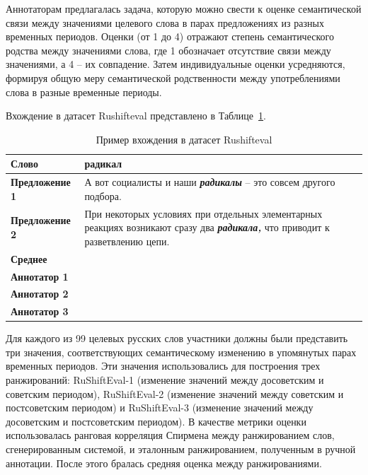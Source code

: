 \documentclass[LI,VKR]{HSEUniversity}
\begin{document}
Аннотаторам предлагалась задача, которую можно свести к оценке семантической связи между значениями
целевого слова в парах предложениях из разных временных периодов.
Оценки (от 1 до 4) отражают степень семантического родства между значениями слова, где
1 обозначает отсутствие связи между значениями, а 4 – их совпадение.
Затем индивидуальные оценки усредняются, формируя общую меру семантической родственности между
употреблениями слова в разные временные периоды.

Вхождение в датасет Rushifteval представлено в Таблице~\ref{tab:Пример вхождения в датасет Rushifteval}.

\begin{table}[H]
\centering
\caption{Пример вхождения в датасет Rushifteval}
\label{tab:Пример вхождения в датасет Rushifteval}
\begin{tabular}{|>{\raggedright\arraybackslash}p{4cm}|>{\raggedright\arraybackslash}p{10cm}|}
\hline
\textbf{Слово} & радикал \\
\hline
\textbf{Предложение 1} & А вот социалисты и наши \textbf{\textit{радикалы}} -- это совсем другого подбора. \\
\hline
\textbf{Предложение 2} & При некоторых условиях при отдельных элементарных реакциях возникают сразу два \textbf{\textit{радикала,}} что приводит к разветвлению цепи. \\
\hline
\textbf{Среднее} & 1.0 \\
\hline
\textbf{Аннотатор 1} & 1 \\
\hline
\textbf{Аннотатор 2} & 1 \\
\hline
\textbf{Аннотатор 3} & 1 \\
\hline
\end{tabular}
\end{table}

Для каждого из 99 целевых русских слов участники должны
были представить три значения, соответствующих семантическому изменению в упомянутых парах
временных периодов.
Эти значения использовались для построения трех ранжирований:
RuShiftEval-1 (изменение значений между досоветским и советским периодом),
RuShiftEval-2 (изменение значений между советским и постсоветским периодом)
и RuShiftEval-3 (изменение значений между досоветским и постсоветским периодом).
В качестве метрики оценки использовалась ранговая корреляция Спирмена между ранжированием слов,
сгенерированным системой, и эталонным ранжированием, полученным в ручной аннотации.
После этого бралась средняя оценка между ранжированиями.
\end{document}
